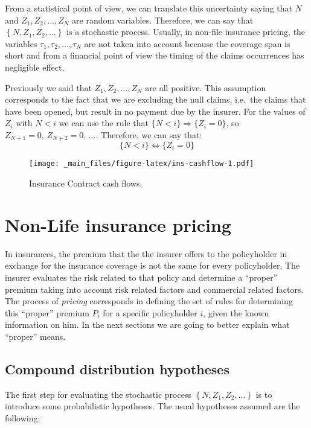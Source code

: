 \documentclass[a4paper, nobind]{templates/ociamthesis}
\theoremstyle{definition}
\theoremstyle{definition}
\theoremstyle{definition}
\theoremstyle{remark}
\begin{document}
From a statistical point of view, we can translate this uncertainty saying that \(N\) and \(Z_1, Z_2, \dots, Z_N\) are random variables. Therefore, we can say that \(\left\{N, Z_1, Z_2, \dots \right\}\) is a stochastic process. Usually, in non-file insurance pricing, the variables \(\tau_1, \tau_2, \dots, \tau_N\) are not taken into account because the coverage span is short and from a financial point of view the timing of the claims occurrences has negligible effect.

Previously we said that \(Z_1, Z_2, \dots, Z_N\) are all positive. This assumption corresponds to the fact that we are excluding the null claims, i.e.~the claims that have been opened, but result in no payment due by the insurer. For the values of \(Z_i\) with \(N<i\) we can use the rule that \(\{N<i\} \Rightarrow \{Z_i = 0\}\), so \(Z_{N+1}=0, \, Z_{N+2}=0, \, \dots\). Therefore, we can say that:
\[
\{N<i \} \Longleftrightarrow \{Z_i = 0\}
\]

\begin{figure}
\centering
\texttt{[image: \_main\_files/figure-latex/ins-cashflow-1.pdf]}
\caption{\label{fig:ins-cashflow}Insurance Contract cash flows.}
\end{figure}

\hypertarget{non-life-insurance-pricing}{%
\section{Non-Life insurance pricing}\label{non-life-insurance-pricing}}

In insurances, the premium that the the insurer offers to the policyholder in exchange for the insurance coverage is not the same for every policyholder. The insurer evaluates the risk related to that policy and determine a ``proper'' premium taking into account risk related factors and commercial related factors. The process of \emph{pricing} corresponds in defining the set of rules for determining this ``proper'' premium \(P_i\) for a specific policyholder \(i\), given the known information on him. In the next sections we are going to better explain what ``proper'' means.

\hypertarget{compound-distribution-hypotheses}{%
\subsection{Compound distribution hypotheses}\label{compound-distribution-hypotheses}}

The first step for evaluating the stochastic process \(\left\{N, Z_1, Z_2, \dots \right\}\) is to introduce some probabilistic hypotheses. The usual hypotheses assumed are the following:
\end{document}
